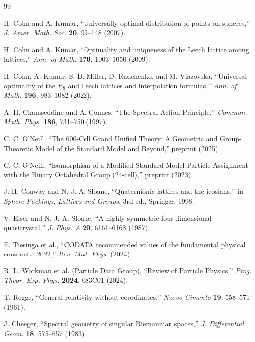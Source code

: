 \documentclass[12pt,a4paper]{article}
\theoremstyle{definition}
\begin{document}
\begin{thebibliography}{99}

H. Cohn and A. Kumar, ``Universally optimal distribution of points on spheres,'' \textit{J. Amer. Math. Soc.} \textbf{20}, 99--148 (2007).

H. Cohn and A. Kumar, ``Optimality and uniqueness of the Leech lattice among lattices,'' \textit{Ann. of Math.} \textbf{170}, 1003--1050 (2009).

H. Cohn, A. Kumar, S. D. Miller, D. Radchenko, and M. Viazovska, ``Universal optimality of the $E_8$ and Leech lattices and interpolation formulas,'' \textit{Ann. of Math.} \textbf{196}, 983--1082 (2022).

A. H. Chamseddine and A. Connes, ``The Spectral Action Principle,'' \textit{Commun. Math. Phys.} \textbf{186}, 731--750 (1997).

C. C. O'Neill, ``The 600-Cell Grand Unified Theory: A Geometric and Group-Theoretic Model of the Standard Model and Beyond,'' preprint (2025).

C. C. O'Neill, ``Isomorphism of a Modified Standard Model Particle Assignment with the Binary Octahedral Group (24-cell),'' preprint (2023).

J. H. Conway and N. J. A. Sloane, ``Quaternionic lattices and the icosians,'' in \textit{Sphere Packings, Lattices and Groups}, 3rd ed., Springer, 1998.

V. Elser and N. J. A. Sloane, ``A highly symmetric four-dimensional quasicrystal,'' \textit{J. Phys. A} \textbf{20}, 6161--6168 (1987).

E. Tiesinga et al., ``CODATA recommended values of the fundamental physical constants: 2022,'' \textit{Rev. Mod. Phys.} (2024).

R. L. Workman et al. (Particle Data Group), ``Review of Particle Physics,'' \textit{Prog. Theor. Exp. Phys.} \textbf{2024}, 083C01 (2024).

T. Regge, ``General relativity without coordinates,'' \textit{Nuovo Cimento} \textbf{19}, 558--571 (1961).

J. Cheeger, ``Spectral geometry of singular Riemannian spaces,'' \textit{J. Differential Geom.} \textbf{18}, 575--657 (1983).


\end{thebibliography}
\end{document}
